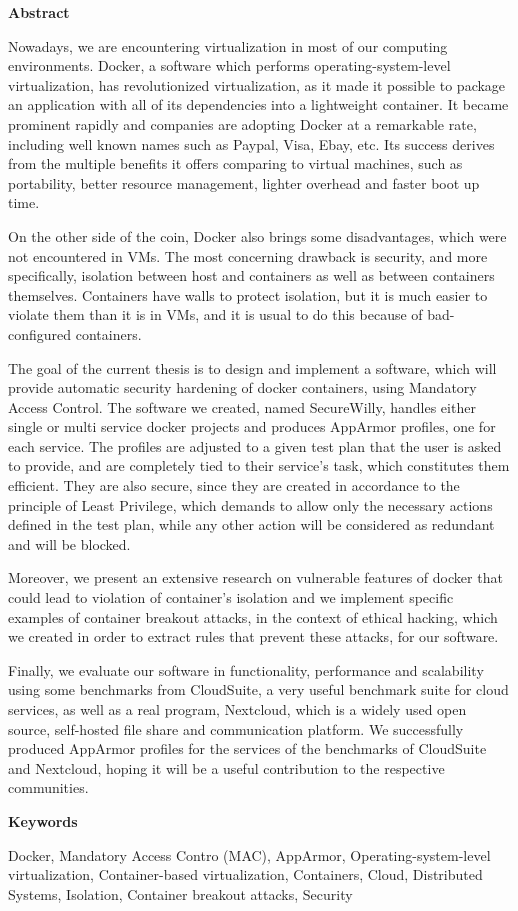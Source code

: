 \hfill\break
\begingroup
\Large{\textbf{Abstract}}
\endgroup
\hfill\break

Nowadays, we are encountering virtualization in most of our computing environments. Docker, a software which performs operating-system-level virtualization, has revolutionized virtualization, as it made it possible to package an application with all of its dependencies into a lightweight container. It became prominent rapidly and companies are adopting Docker at a remarkable rate, including well known names such as Paypal, Visa, Ebay, etc. Its success derives from the multiple benefits it offers comparing to virtual machines, such as portability, better resource management, lighter overhead and faster boot up time. 

On the other side of the coin, Docker also brings some disadvantages, which were not encountered in VMs. The most concerning drawback is security, and more specifically, isolation between host and containers as well as between containers themselves. Containers have walls to protect isolation, but it is much easier to violate them than it is in VMs, and it is usual to do this because of bad-configured containers.

The goal of the current thesis is to design and implement a software, which will provide automatic security hardening of docker containers, using Mandatory Access Control. The software we created, named SecureWilly, handles either single or multi service docker projects and produces AppArmor profiles, one for each service. The profiles are adjusted to a given test plan that the user is asked to provide, and are completely tied to their service's task, which constitutes them efficient. They are also secure, since they are created in accordance to the principle of Least Privilege, which demands to allow only the necessary actions defined in the test plan, while any other action will be considered as redundant and will be blocked.

Moreover, we present an extensive research on vulnerable features of docker that could lead to violation of container's isolation and we implement specific examples of container breakout attacks, in the context of ethical hacking, which we created in order to extract rules that prevent these attacks, for our software.

Finally, we evaluate our software in functionality, performance and scalability using some benchmarks from CloudSuite, a very useful benchmark suite for cloud services, as well as a real program, Nextcloud, which is a widely used open source, self-hosted file share and communication platform. We successfully produced AppArmor profiles for the services of the benchmarks of CloudSuite and Nextcloud, hoping it will be a useful contribution to the respective communities.

\hfill\break
\begingroup
\Large{\textbf{Keywords}}
\endgroup

\hfill\break
Docker, Mandatory Access Contro (MAC), AppArmor, Operating-system-level virtualization, Container-based virtualization, Containers, Cloud, Distributed Systems, Isolation, Container breakout attacks, Security

\clearpage\null\thispagestyle{empty}
\newpage
